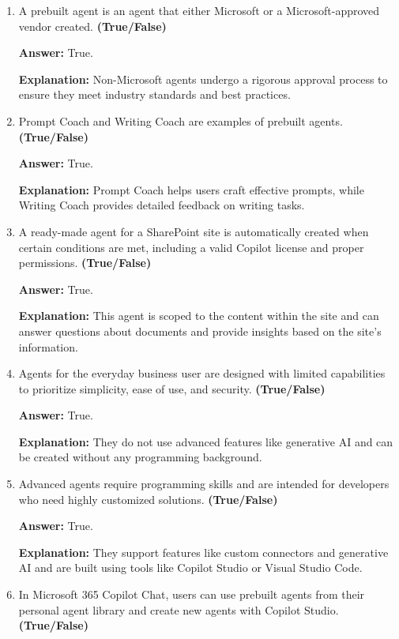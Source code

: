 \documentclass[10pt]{article}
\begin{document}
\begin{enumerate}[leftmargin=*]
\textbf{Explanation:} These four categories cover agents from Microsoft-created, site-specific, user-created simple agents, to developer-built sophisticated agents.

\item A prebuilt agent is an agent that either Microsoft or a Microsoft-approved vendor created. \textbf{(True/False)}

\textbf{Answer:} True.

\textbf{Explanation:} Non-Microsoft agents undergo a rigorous approval process to ensure they meet industry standards and best practices.

\item Prompt Coach and Writing Coach are examples of prebuilt agents. \textbf{(True/False)}

\textbf{Answer:} True.

\textbf{Explanation:} Prompt Coach helps users craft effective prompts, while Writing Coach provides detailed feedback on writing tasks.

\item A ready-made agent for a SharePoint site is automatically created when certain conditions are met, including a valid Copilot license and proper permissions. \textbf{(True/False)}

\textbf{Answer:} True.

\textbf{Explanation:} This agent is scoped to the content within the site and can answer questions about documents and provide insights based on the site’s information.

\item Agents for the everyday business user are designed with limited capabilities to prioritize simplicity, ease of use, and security. \textbf{(True/False)}

\textbf{Answer:} True.

\textbf{Explanation:} They do not use advanced features like generative AI and can be created without any programming background.

\item Advanced agents require programming skills and are intended for developers who need highly customized solutions. \textbf{(True/False)}

\textbf{Answer:} True.

\textbf{Explanation:} They support features like custom connectors and generative AI and are built using tools like Copilot Studio or Visual Studio Code.

\item In Microsoft 365 Copilot Chat, users can use prebuilt agents from their personal agent library and create new agents with Copilot Studio. \textbf{(True/False)}


\end{enumerate}
\end{document}
